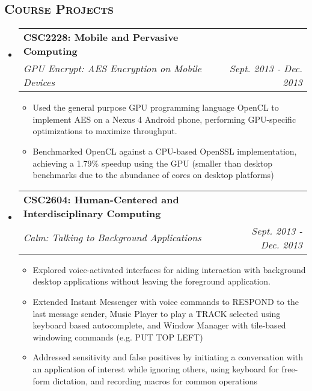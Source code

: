 \documentclass[letterpaper,11pt]{article}
\makeatletter
\newcommand{\company}[1]{
    \textbf{#1}
}
\newcommand{\heading}[1]{
    \textsc{\textbf{#1}}
}
\newcommand*\resheading[1]{\subsection*{\heading{#1}}\vspace{0.3em}\nopagebreak[4]}
\newcommand{\resitem}[1]{\item #1 \vspace{-2pt}}
\newcommand{\ressubheading}[4]{
\begin{tabular*}{6.5in}{l@{\extracolsep{\fill}}r}
    
		\company{#1} & #2 \\
		\textit{#3} & \textit{#4} \\
\end{tabular*}\vspace{-6pt}}
\makeatother
\begin{document}
\resheading{Course Projects}
\begin{itemize}

\item

	\ressubheading{CSC2228: Mobile and Pervasive Computing}{}{GPU Encrypt: AES Encryption on Mobile Devices}{Sept. 2013 - Dec. 2013}
	\begin{itemize}
		\resitem{
            Used the general purpose GPU programming language OpenCL to implement AES on a 
            Nexus 4 Android phone, performing GPU-specific optimizations to maximize 
            throughput.
        }
		\resitem{
            Benchmarked OpenCL against a CPU-based OpenSSL implementation, achieving a 
            1.79\% speedup using the GPU (smaller than desktop benchmarks due to the 
            abundance of cores on desktop platforms)
        }
	\end{itemize}

\item
	\ressubheading{CSC2604: Human-Centered and Interdisciplinary Computing}{}{Calm: Talking to Background Applications}{Sept. 2013 - Dec. 2013}
	\begin{itemize}
		\resitem{
            Explored voice-activated interfaces for aiding interaction with background 
            desktop applications without leaving the foreground application.
        }
		\resitem{
            Extended Instant Messenger with voice commands to RESPOND to the last message 
            sender, Music Player to play a TRACK selected using keyboard based 
            autocomplete, and Window Manager with tile-based windowing commands (e.g. PUT 
            TOP LEFT)
        }
		\resitem{
            Addressed sensitivity and false positives by initiating a conversation with an
            application of interest while ignoring others, using keyboard for free-form 
            dictation, and recording macros for common operations
        }
	\end{itemize}

\end{itemize}
\end{document}
